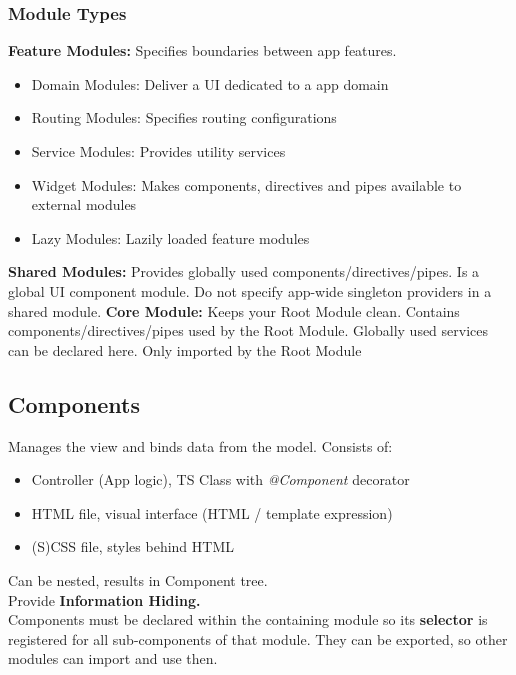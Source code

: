 \subsubsection{Module Types}
\textbf{Feature Modules:} Specifies boundaries between app features.
\begin{itemize}
    \item Domain Modules: Deliver a UI dedicated to a app domain
    \item Routing Modules: Specifies routing configurations
    \item Service Modules: Provides utility services
    \item Widget Modules: Makes components, directives and pipes available to external modules
    \item Lazy Modules: Lazily loaded feature modules
\end{itemize}
\textbf{Shared Modules:} Provides globally used components/directives/pipes.
Is a global UI component module.
Do not specify app-wide singleton providers in a shared module.
\textbf{Core Module:} Keeps your Root Module clean.
Contains components/directives/pipes used by the Root Module.
Globally used services can be declared here.
Only imported by the Root Module


\subsection{Components}
Manages the view and binds data from the model. Consists of:
\begin{itemize}
    \item Controller (App logic), TS Class with \textit{@Component} decorator
    \item HTML file, visual interface (HTML / template expression)
    \item (S)CSS file, styles behind HTML
\end{itemize}
Can be nested, results in Component tree.\\
Provide \textbf{Information Hiding.}\\
Components must be declared within the containing module so its \textbf{selector} is registered for all sub-components of that module.
They can be exported, so other modules can import and use then.

